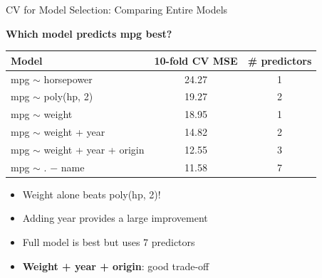 \documentclass[aspectratio=169, 11pt]{beamer}
\begin{document}
\begin{frame}{CV for Model Selection: Comparing Entire Models}

\textbf{Which model predicts mpg best?}

\vspace{0.3em}
\begin{center}
\begin{tabular}{lcc}
\toprule
Model & 10-fold CV MSE & \# predictors \\
\midrule
mpg $\sim$ horsepower & 24.27 & 1 \\
mpg $\sim$ poly(hp, 2) & 19.27 & 2 \\
mpg $\sim$ weight & 18.95 & 1 \\
mpg $\sim$ weight + year & 14.82 & 2 \\
\textcolor{softgreen}{mpg $\sim$ weight + year + origin} & \textcolor{softgreen}{12.55} & \textcolor{softgreen}{3} \\
mpg $\sim$ . $-$ name & 11.58 & 7 \\
\bottomrule
\end{tabular}
\end{center}

\vspace{0.3em}
\begin{itemize}
  \item Weight alone beats poly(hp, 2)!
  \item Adding year provides a large improvement
  \item Full model is best but uses 7 predictors
  \item \textbf{Weight + year + origin}: good trade-off
\end{itemize}
\end{frame}
\end{document}
